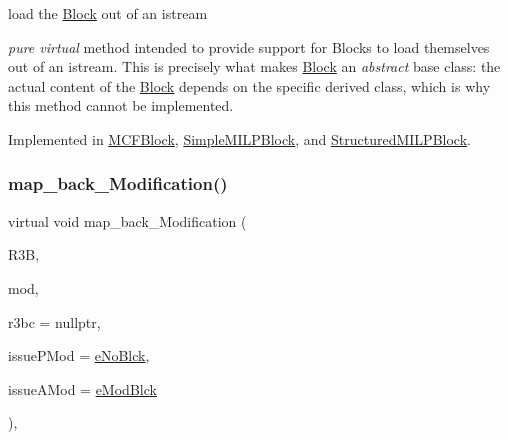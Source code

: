 load the \mbox{\hyperlink{class_s_m_spp__di__unipi__it_1_1_block}{Block}} out of an istream 

{\itshape pure virtual} method intended to provide support for Blocks to load themselves out of an istream. This is precisely what makes \mbox{\hyperlink{class_s_m_spp__di__unipi__it_1_1_block}{Block}} an {\itshape abstract} base class\+: the actual content of the \mbox{\hyperlink{class_s_m_spp__di__unipi__it_1_1_block}{Block}} depends on the specific derived class, which is why this method cannot be implemented. 

Implemented in \mbox{\hyperlink{class_s_m_spp__di__unipi__it_1_1_m_c_f_block_a221601b23896f7a98c6914f42224d446}{M\+C\+F\+Block}}, \mbox{\hyperlink{class_s_m_spp__di__unipi__it_1_1_simple_m_i_l_p_block_a019850055afe817b816bae5699f461d3}{Simple\+M\+I\+L\+P\+Block}}, and \mbox{\hyperlink{class_s_m_spp__di__unipi__it_1_1_structured_m_i_l_p_block_a019850055afe817b816bae5699f461d3}{Structured\+M\+I\+L\+P\+Block}}.

\mbox{\label{class_s_m_spp__di__unipi__it_1_1_block_a9524f314b064aafbd8d2f8a398b797a2}} 
\subsubsection{\texorpdfstring{map\+\_\+back\+\_\+\+Modification()}{map\_back\_Modification()}}
{\footnotesize\ttfamily virtual void map\+\_\+back\+\_\+\+Modification (\begin{DoxyParamCaption}\item[{\mbox{\hyperlink{class_s_m_spp__di__unipi__it_1_1_block}{Block}} $\ast$}]{R3B,  }\item[{\mbox{\hyperlink{group___modification___t_y_p_e_s_ga9024cf2ead61a1280d29771b063b1a62}{sp\+\_\+\+Mod}}}]{mod,  }\item[{\mbox{\hyperlink{class_s_m_spp__di__unipi__it_1_1_configuration}{Configuration}} $\ast$}]{r3bc = {\ttfamily nullptr},  }\item[{\mbox{\hyperlink{group___modification___t_y_p_e_s_ga544246d8c462e9a2d817c2c30797968f}{c\+\_\+\+Mod\+Param}}}]{issue\+P\+Mod = {\ttfamily \mbox{\hyperlink{group___modification___t_y_p_e_s_gga48fddcdd03a03f49b7e389ca1ed938d4ada69e89c5f46e563d8a13cfa6830c136}{e\+No\+Blck}}},  }\item[{\mbox{\hyperlink{group___modification___t_y_p_e_s_ga544246d8c462e9a2d817c2c30797968f}{c\+\_\+\+Mod\+Param}}}]{issue\+A\+Mod = {\ttfamily \mbox{\hyperlink{group___modification___t_y_p_e_s_gga48fddcdd03a03f49b7e389ca1ed938d4a21b14b26b1c0093a0905f6fc010bad29}{e\+Mod\+Blck}}} }\end{DoxyParamCaption})\hspace{0.3cm}{\ttfamily [inline]}, {\ttfamily [virtual]}}



